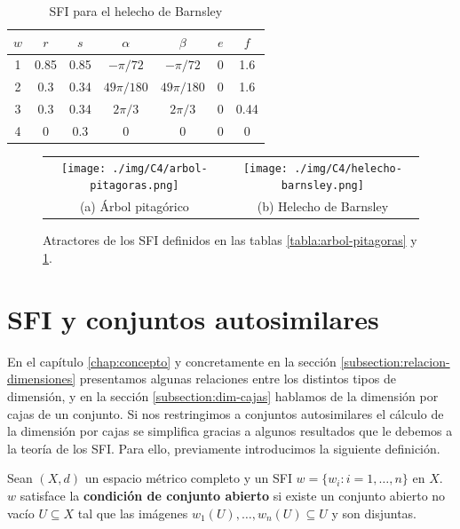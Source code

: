 \begin{table}
    \centering
    \begin{tabular}{c|cccccc} \hline
        $w$ & $r$ & $s$ & $\alpha$ & $\beta$ & $e$ & $f$ \\ \hline\hline
    1 & 0.85 & 0.85 & $-\pi/72$ & $-\pi/72$ & 0 & 1.6 \\ \hline
    2 & 0.3 & 0.34 & $49 \pi/180$ & $49 \pi/180$ & 0 & 1.6 \\ \hline
    3 & 0.3 & 0.34 & $2 \pi/3$ & $2 \pi/3$ & 0 & 0.44 \\ \hline
    4 & 0 & 0.3 & 0 & 0 & 0 & 0 \\ \hline
    \end{tabular}
    \caption{SFI para el helecho de Barnsley}
    \label{tabla:helecho-Barnsley}
\end{table}

\begin{figure}[ht]
    \centering
    \begin{tabular}{cc}
      \texttt{[image: ./img/C4/arbol-pitagoras.png]} &   \texttt{[image: ./img/C4/helecho-barnsley.png]} \\
    (a) Árbol pitagórico & (b) Helecho de Barnsley 
    \end{tabular}
    \caption{Atractores de los SFI definidos en las tablas \ref{tabla:arbol-pitagoras} y \ref{tabla:helecho-Barnsley}.}
    \label{fig:atractores-sfi}
\end{figure}

\section{SFI y conjuntos autosimilares}
\label{section:sfi-conjuntos-autosimilares}

En el capítulo \ref{chap:concepto} y concretamente en la sección \ref{subsection:relacion-dimensiones} presentamos algunas relaciones entre los distintos tipos de dimensión, y en la sección \ref{subsection:dim-cajas} hablamos de la dimensión por cajas de un conjunto. Si nos restringimos a conjuntos autosimilares el cálculo de la dimensión por cajas se simplifica gracias a algunos resultados que le debemos a la teoría de los SFI. Para ello, previamente introducimos la siguiente definición.

\begin{definicion}
    \label{def:condicion-conjunto-abierto}
    Sean $(X,d)$ un espacio métrico completo y un SFI $w=\{w_i:i=1,\dots,n\}$ en $X$. $w$ satisface la \textbf{condición de conjunto abierto} si existe un conjunto abierto no vacío $U\subseteq X$ tal que las imágenes $w_1(U),\dots,w_n(U)\subseteq U$ y son disjuntas.
\end{definicion}

